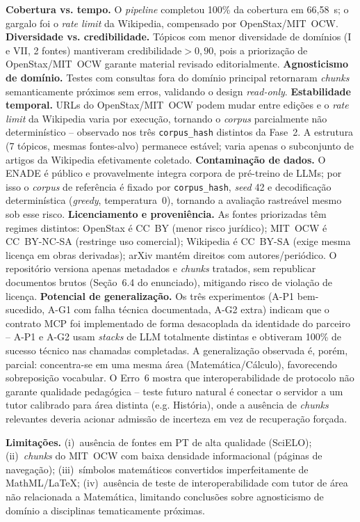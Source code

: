 \documentclass[12pt]{article}
\begin{document}
\textbf{Cobertura vs. tempo.} O \textit{pipeline} completou 100\% da cobertura em 66,58~s; o
gargalo foi o \textit{rate limit} da Wikipedia, compensado por OpenStax/MIT~OCW.
\textbf{Diversidade vs. credibilidade.} Tópicos com menor diversidade de domínios (I e VII, 2
fontes) mantiveram credibilidade${}>0{,}90$, pois a priorização de OpenStax/MIT~OCW garante
material revisado editorialmente.
\textbf{Agnosticismo de domínio.} Testes com consultas fora do domínio principal retornaram
\textit{chunks} semanticamente próximos sem erros, validando o design \textit{read-only}.
\textbf{Estabilidade temporal.} URLs do OpenStax/MIT~OCW podem mudar entre edições e o
\textit{rate limit} da Wikipedia varia por execução, tornando o \textit{corpus} parcialmente
não determinístico -- observado nos três \texttt{corpus\_hash} distintos da Fase~2. A estrutura
(7 tópicos, mesmas fontes-alvo) permanece estável; varia apenas o subconjunto de artigos da
Wikipedia efetivamente coletado.
\textbf{Contaminação de dados.} O ENADE é público e provavelmente integra corpora de pré-treino
de LLMs; por isso o \textit{corpus} de referência é fixado por \texttt{corpus\_hash}, \textit{seed}
42 e decodificação determinística (\textit{greedy}, temperatura~0), tornando a avaliação
rastreável mesmo sob esse risco.
\textbf{Licenciamento e proveniência.} As fontes priorizadas têm regimes distintos: OpenStax é
CC~BY (menor risco jurídico); MIT~OCW é CC~BY-NC-SA (restringe uso comercial); Wikipedia é
CC~BY-SA (exige mesma licença em obras derivadas); arXiv mantém direitos com autores/periódico. O
repositório versiona apenas metadados e \textit{chunks} tratados, sem republicar documentos
brutos (Seção~6.4 do enunciado), mitigando risco de violação de licença.
\textbf{Potencial de generalização.} Os três experimentos (A-P1 bem-sucedido, A-G1 com falha
técnica documentada, A-G2 extra) indicam que o contrato MCP foi implementado de forma desacoplada
da identidade do parceiro -- A-P1 e A-G2 usam \textit{stacks} de LLM totalmente distintas e
obtiveram 100\% de sucesso técnico nas chamadas completadas. A generalização observada é, porém,
parcial: concentra-se em uma mesma área (Matemática/Cálculo), favorecendo sobreposição vocabular.
O Erro~6 mostra que interoperabilidade de protocolo não garante qualidade pedagógica -- teste
futuro natural é conectar o servidor a um tutor calibrado para área distinta (e.g. História), onde
a ausência de \textit{chunks} relevantes deveria acionar admissão de incerteza em vez de
recuperação forçada.

\textbf{Limitações.} (i)~ausência de fontes em PT de alta qualidade (SciELO); (ii)~\textit{chunks}
do MIT~OCW com baixa densidade informacional (páginas de navegação); (iii)~símbolos matemáticos
convertidos imperfeitamente de MathML/\LaTeX; (iv)~ausência de teste de interoperabilidade com
tutor de área não relacionada a Matemática, limitando conclusões sobre agnosticismo de domínio a
disciplinas tematicamente próximas.
\end{document}
